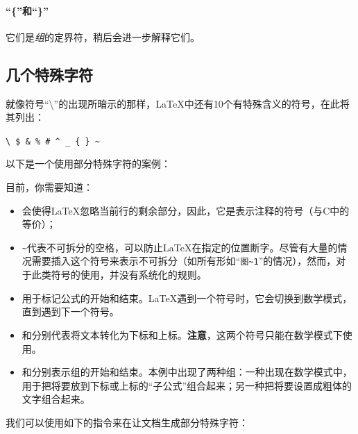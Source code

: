 \paragraph*{“\{”和“\}”}它们是\textit{组}的定界符，稍后会进一步解释它们。

\subsection{几个特殊字符}

就像符号“\backslash”的出现所暗示的那样，\LaTeX 中还有10个有特殊含义的符号，在此将其列出：

\begin{dmd}
    \verb+\ $ & % # ^ _ { } ~+
\end{dmd}


以下是一个使用部分特殊字符的案例：


目前，你需要知道：

\begin{itemize}
    \item \dm{\%}会使得\LaTeX 忽略当前行的剩余部分，因此，它是表示注释的符号（与C中的\dm{//}等价）；
    \item \verb+~+代表不可拆分的空格，可以防止\LaTeX 在指定的位置断字。尽管有大量的情况需要插入这个符号来表示不可拆分（如所有形如“\verb+图~1+”的情况），然而，对于此类符号的使用，并没有系统化的规则。
    \item \dm{\$}用于标记公式的开始和结束。\LaTeX 遇到一个\dm{\$}符号时，它会切换到数学模式，直到遇到下一个\dm{\$}符号。
    \item \dm{\_}和\dm{\^{}}分别代表将文本转化为下标和上标。\textbf{注意}，这两个符号只能在数学模式下使用。
    \item \dm{\{}和\dm{\}}分别表示组的开始和结束。本例中出现了两种组：一种出现在数学模式中，用于把将要放到下标或上标的“子公式”组合起来；另一种把将要设置成粗体的文字组合起来。
\end{itemize}

我们可以使用如下的指令来在让文档生成部分特殊字符：

